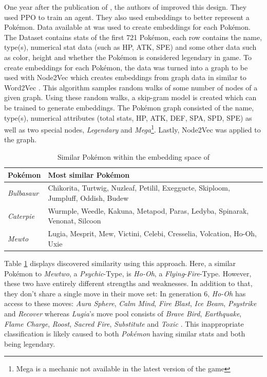 One year after the publication of \cite{Lee_Togelius_2017}, the authors of \cite{GottaTrainEmAll} 
improved this design. They used \ac{PPO} \cite{schulman2017proximal} to train an agent. They also
used embeddings to better represent a Pokémon. Data available at \cite{Kaggle:NewYorkData} was used
to create embeddings for each Pokémon. The Dataset contains stats of the first 721 Pokémon, each 
row contains the name, type(s), numerical stat data (such as \ac{HP}, \ac{ATK}, \ac{SPE}) and some other
data such as color, height and whether the Pokémon is considered legendary in game. To create
embeddings for each Pokémon, the data was turned into a graph to be used with Node2Vec 
\cite{grover2016node2vec} which creates embeddings from graph data in similar to
Word2Vec \cite{mikolov2013distributed}. This algorithm samples random walks of some number
of nodes of a given graph. Using these random walks, a skip-gram model is created which
can be trained to generate embeddings. The Pokémon graph consisted of the name, type(s),
numerical attributes (total stats, \ac{HP}, \ac{ATK}, \ac{DEF}, \ac{SPA}, \ac{SPD}, \ac{SPE})
as well as two special nodes, \textit{Legendary} and \textit{Mega}\footnote{Mega is a mechanic
not available in the latest version of the game}. Lastly, Node2Vec was applied to the graph.
\begin{table}[h]
    \centering
        \begin{tabular}{|l|p{}|}
            \hline
            Pokémon & Most similar Pokémon \\
            \hline
            \emph{Bulbasaur} & Chikorita, Turtwig, Nuzleaf, Petilil, Exeggucte, Skiploom, Jumpluff, Oddish, Budew \\
            \hline
            \emph{Caterpie} & Wurmple, Weedle, Kakuna, Metapod, Paras, Ledyba, Spinarak, Venonat, Silcoon \\
            \hline
            \emph{Mewto} & Lugia, Mesprit, Mew, Victini, Celebi, Cresselia, Volcation, \mbox{Ho-Oh}, Uxie \\
            \hline
        \end{tabular}
        \caption{Similar Pokémon within the embedding space of \cite{GottaTrainEmAll}}
        \label{tbl:Gotta-Embeddings}
\end{table}
Table \ref{tbl:Gotta-Embeddings} displays discovered similarity using this approach. Here, a similar Pokémon
to \textit{Mewtwo}, a \textit{Psychic}-Type, is \textit{Ho-Oh}, a \textit{Flying}-\textit{Fire}-Type. However,
these two have entirely different strengths and weaknesses. In addition to that, they don't share a single
move in their move set: 
In generation 6, \textit{Ho-Oh} has access to these moves: \textit{Aura Sphere}, \textit{Calm Mind}, 
\textit{Fire Blast}, \textit{Ice Beam}, \textit{Psystrike} and \textit{Recover} whereas \textit{Lugia}'s
move pool consists of \textit{Brave Bird}, \textit{Earthquake}, \textit{Flame Charge}, \textit{Roost},
\textit{Sacred Fire}, \textit{Substitute} and \textit{Toxic} \cite{DamageCalc:Gen6}. This inappropriate
classification is likely caused to both \textit{Pokémon} having similar stats and both being legendary.

